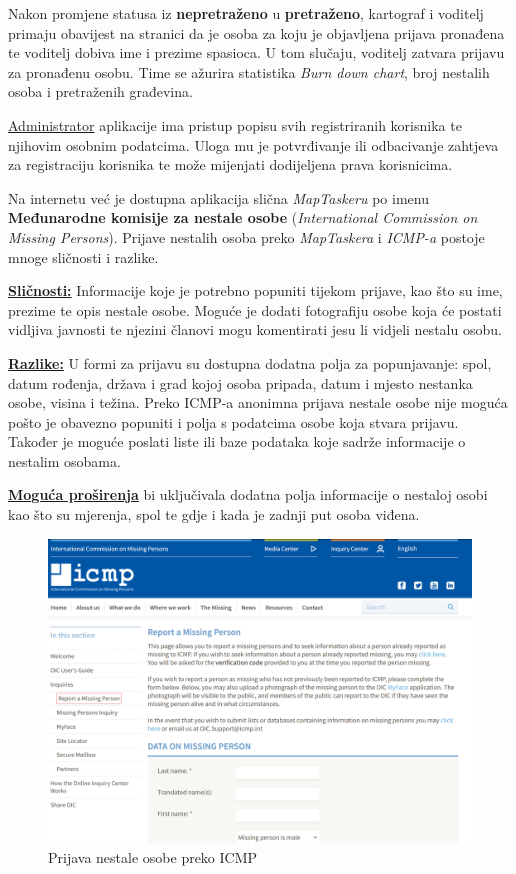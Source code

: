 			Nakon promjene statusa iz \textbf{nepretraženo} u \textbf{pretraženo}, kartograf i voditelj primaju obavijest na stranici da je osoba za koju je objavljena prijava pronađena te voditelj dobiva ime i prezime spasioca. U tom slučaju, voditelj zatvara prijavu za pronađenu osobu. Time se ažurira statistika \textit{Burn down chart}, broj nestalih osoba i pretraženih građevina. 
			
			\underline{Administrator} aplikacije ima pristup popisu svih registriranih korisnika te njihovim osobnim podatcima. Uloga mu je potvrđivanje ili odbacivanje zahtjeva za registraciju korisnika te može mijenjati dodijeljena prava korisnicima.
			

            Na internetu već je dostupna aplikacija slična \textit{MapTaskeru} po imenu \textbf{Međunarodne komisije za nestale osobe} (\textit{International Commission on Missing Persons}). Prijave nestalih osoba preko \textit{MapTaskera} i \textit{ICMP-a} postoje mnoge sličnosti i razlike. 

            \underline{\textbf{Sličnosti:}} Informacije koje je potrebno popuniti tijekom prijave, kao što su ime, prezime te opis nestale osobe. Moguće je dodati fotografiju osobe koja će postati vidljiva javnosti te njezini članovi mogu komentirati jesu li vidjeli nestalu osobu.

            \underline{\textbf{Razlike:}} U formi za prijavu su dostupna dodatna polja za popunjavanje: spol, datum rođenja, država i grad kojoj osoba pripada, datum i mjesto nestanka osobe, visina i težina. Preko ICMP-a anonimna prijava nestale osobe nije moguća pošto je obavezno popuniti i polja s podatcima osobe koja stvara prijavu. Također je moguće poslati liste ili baze podataka koje sadrže informacije o nestalim osobama.


            \underline{\textbf{Moguća proširenja}} bi uključivala dodatna polja informacije o nestaloj osobi kao što su mjerenja, spol te gdje i kada je zadnji put osoba viđena.

            \begin{figure}[H]
			         \includegraphics[scale=0.5]{slike/ICMP.png} %
			         \centering
			         \caption{Prijava nestale osobe preko ICMP}
			         \label{fig:promjene}
		      \end{figure}


